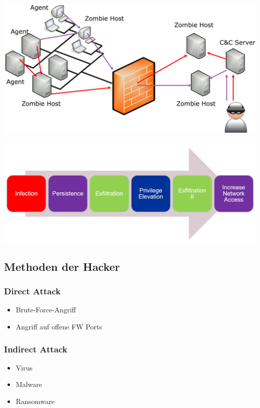 \begin{center}
    \vspace{-8pt}
    \includegraphics[width=.8\linewidth]{./img/01-cyber_defense/apt_diagram}
    \vspace{-8pt}
\end{center}

\begin{center}
    \vspace{-8pt}
    \includegraphics[width=.8\linewidth]{./img/01-cyber_defense/apt_process}
    \vspace{-8pt}
\end{center}

\subsection{Methoden der Hacker}\label{subsec:methoden-der-hacker}

\subsubsection{Direct Attack}
\begin{itemize}
    \item Brute-Force-Angriff
    \item Angriff auf offene FW Ports
\end{itemize}


\subsubsection{Indirect Attack}
\begin{itemize}
    \item Virus
    \item Malware
    \item Ransomware
\end{itemize}


